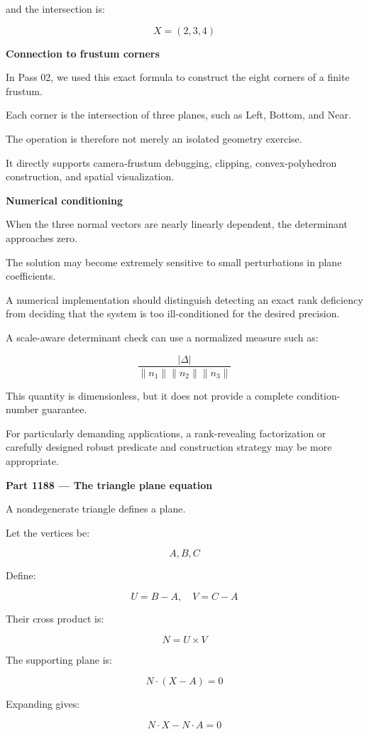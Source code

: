 and the intersection is:

\[
\boxed{X=(2,3,4)}
\]

\textbf{Connection to frustum corners}

In Pass 02, we used this exact formula to construct the eight corners of a finite frustum.

Each corner is the intersection of three planes, such as Left, Bottom, and Near.

The operation is therefore not merely an isolated geometry exercise.

It directly supports camera-frustum debugging, clipping, convex-polyhedron construction, and spatial visualization.

\textbf{Numerical conditioning}

When the three normal vectors are nearly linearly dependent, the determinant approaches zero.

The solution may become extremely sensitive to small perturbations in plane coefficients.

A numerical implementation should distinguish detecting an exact rank deficiency from deciding that the system is too ill-conditioned for the desired precision.

A scale-aware determinant check can use a normalized measure such as:

\[
\frac{|\Delta|} {\|n_1\|\|n_2\|\|n_3\|}
\]

This quantity is dimensionless, but it does not provide a complete condition-number guarantee.

For particularly demanding applications, a rank-revealing factorization or carefully designed robust predicate and construction strategy may be more appropriate.

\textbf{Part 1188 --- The triangle plane equation}

A nondegenerate triangle defines a plane.

Let the vertices be:

\[
A,B,C
\]

Define:

\[
U=B-A,\quad V=C-A
\]

Their cross product is:

\[
N=U\times V
\]

The supporting plane is:

\[
\boxed{ N\cdot(X-A)=0 }
\]

Expanding gives:

\[
\boxed{ N\cdot X-N\cdot A=0 }
\]

